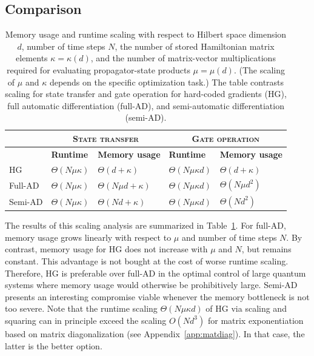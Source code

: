 \subsection{Comparison}
\label{sec:scaling_comparison}

\begin{table}[t]
\renewcommand{\arraystretch}{1.5}
\centering
\caption[Memory usage and runtime scaling with respect to Hilbert space dimension $d$, number of time steps $N$, the number of stored Hamiltonian matrix elements $\kappa=\kappa(d)$, and the number of matrix-vector multiplications required for evaluating propagator-state products $\mu=\mu(d)$.]{Memory usage and runtime scaling with respect to Hilbert space dimension $d$, number of time steps $N$, the number of stored Hamiltonian matrix elements $\kappa=\kappa(d)$, and the number of matrix-vector multiplications required for evaluating propagator-state products $\mu=\mu(d)$. (The scaling of $\mu$ and $\kappa$ depends on the specific optimization task.) The table contrasts scaling for state transfer and gate operation for hard-coded gradients (HG), full automatic differentiation (full-AD), and semi-automatic differentiation (semi-AD).}
\label{tab:scalingtable}
\begin{tabular}
{p{}p{}p{}p{}p{}} 
\hline
\hline
& \multicolumn{2}{c}{\textbf{\textsc{State transfer}}} & \multicolumn{2}{c}{\textbf{\textsc{Gate operation}}}\\
\hline 
& \textbf{Runtime} & \textbf{Memory usage} & \textbf{Runtime} & \textbf{Memory usage}
\\
\hline
HG & $\Theta(N\mu \kappa)$ & $\Theta(d+\kappa)$ & $\Theta(N\mu \kappa d)$ & $\Theta(d+\kappa)$\\ 
Full-AD & $\Theta(N\mu \kappa)$ & $\Theta(N\mu d+\kappa)$ & $\Theta(N\mu \kappa d)$ & $\Theta(N\mu d^2)$  \\
Semi-AD & $\Theta(N\mu \kappa)$ & $\Theta(Nd+\kappa)$ & $\Theta(N\mu \kappa d)$ & $\Theta(Nd^2)$\\ 
\hline \hline
\end{tabular} 
\end{table}

The results of this scaling analysis are summarized in Table~\ref{tab:scalingtable}. For full-AD, memory usage grows linearly with respect to $\mu$ and number of time steps $N$. By contrast, memory usage for HG does not increase with $\mu$ and $N$, but remains constant. This advantage is not bought at the cost of worse runtime scaling. Therefore, HG is preferable over full-AD in the optimal control of large quantum systems where memory usage would otherwise be prohibitively large. Semi-AD presents an interesting compromise viable whenever the memory bottleneck is not too severe. Note that the runtime scaling $\Theta(N\mu\kappa d)$ of HG via scaling and squaring can in principle exceed the scaling $O(Nd^3)$ for matrix exponentiation based on matrix diagonalization (see Appendix~\ref{app:matdiag}). In that case, the latter is the better option.

